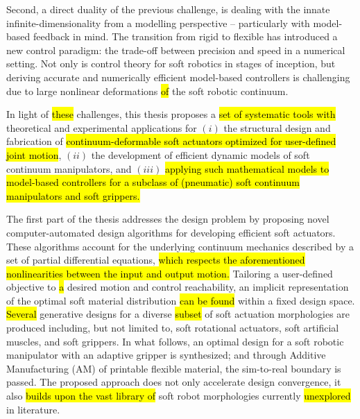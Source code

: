 Second, a direct duality of the previous challenge, is dealing with the innate infinite-dimensionality from a modelling perspective -- particularly with model-based feedback in mind. The transition from rigid to flexible has introduced a new control paradigm: the trade-off between precision and speed in a numerical setting. Not only is control theory for soft robotics in stages of inception, but deriving accurate and numerically efficient model-based controllers is challenging due to large nonlinear deformations \hl{of} the soft robotic continuum.

In light of \hl{these} challenges, this thesis proposes a \hl{set of systematic tools with} theoretical and experimental applications for $(i)$ 
the structural design and fabrication of \hl{continuum-deformable soft actuators optimized for user-defined joint motion}, $(ii)$ the development of efficient dynamic models of soft continuum manipulators, and $(iii)$ \hl{applying such mathematical models to model-based controllers for a subclass of (pneumatic) soft continuum manipulators and soft grippers.}

The first part of the thesis addresses the design problem by proposing novel computer-automated design algorithms for developing efficient soft actuators. These algorithms account for the underlying continuum mechanics described by a set of partial differential equations, \hl{which respects the aforementioned nonlinearities between the input and output motion.} Tailoring a user-defined objective to \hl{a} desired motion and control reachability, an implicit representation of the optimal soft material distribution \hl{can be found} within a fixed design space. \hl{Several} generative designs for a diverse \hl{subset} of soft actuation morphologies are produced including, but not limited to, soft rotational actuators, soft artificial muscles, and soft grippers. In what follows, an optimal design for a soft robotic manipulator with an adaptive gripper is synthesized; and through Additive Manufacturing (AM) of printable flexible material, the sim-to-real boundary is passed. The proposed approach does not only accelerate design convergence, it also \hl{builds upon the vast library of} soft robot morphologies currently \hl{unexplored} in literature.


